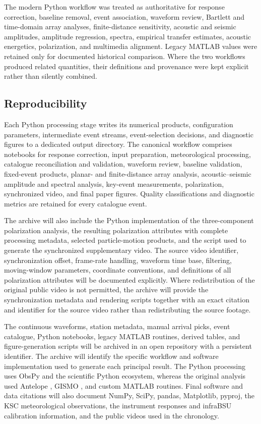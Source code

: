 \documentclass[]{seismica}
\begin{document}
The modern Python workflow was treated as authoritative for response
correction, baseline removal, event association, waveform review, Bartlett and
time-domain array analyses, finite-distance sensitivity, acoustic and seismic
amplitudes, amplitude regression, spectra, empirical transfer estimates,
acoustic energetics, polarization, and multimedia alignment. Legacy MATLAB
values were retained only for documented historical comparison. Where the two
workflows produced related quantities, their definitions and provenance were
kept explicit rather than silently combined.

\subsection{Reproducibility}

Each Python processing stage writes its numerical products, configuration parameters, intermediate event streams, event-selection decisions, and diagnostic figures to a dedicated output directory. The canonical workflow comprises notebooks for response correction, input preparation, meteorological processing, catalogue reconciliation and validation, waveform review, baseline validation, fixed-event products, planar- and finite-distance array analysis, acoustic--seismic amplitude and spectral analysis, key-event measurements, polarization, synchronized video, and final paper figures. Quality classifications and diagnostic metrics are retained for every catalogue event.

The archive will also include the Python implementation of the
three-component polarization analysis, the resulting polarization attributes
with complete processing metadata, selected particle-motion products, and the
script used to generate the synchronized supplementary video. The source video identifier, synchronization
offset, frame-rate handling, waveform time base, filtering, moving-window
parameters, coordinate conventions, and definitions of all polarization
attributes will be documented explicitly. Where redistribution of the original
public video is not permitted, the archive will provide the synchronization
metadata and rendering scripts together with an exact citation and identifier
for the source video rather than redistributing the source footage.

The continuous waveforms, station metadata, manual arrival picks, event catalogue, Python notebooks, legacy MATLAB routines, derived tables, and figure-generation scripts will be archived in an open repository with a persistent identifier. The archive will identify the specific workflow and software implementation used to generate each principal result. The Python processing uses ObsPy \citep{beyreuther_obspy_2010,krischer_obspy_2015}
and the scientific Python ecosystem, whereas the original analysis used
Antelope \citep{brtt_antelope}, GISMO \citep{thompson_gismo_2017}, and custom
MATLAB routines. Final software and data citations will also document NumPy,
SciPy, pandas, Matplotlib, pyproj, the KSC meteorological observations, the
instrument responses and infraBSU calibration information, and the public
videos used in the chronology.
\end{document}
